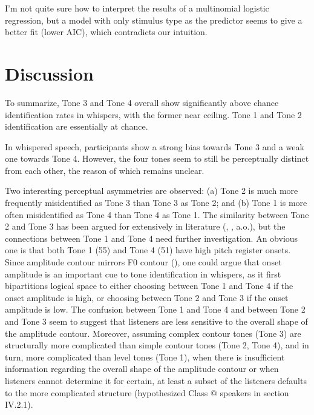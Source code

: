 \documentclass[12pt,letterpaper]{scrartcl}
\makeatletter
\newcommand*{\rom}[1]{\expandafter\@slowromancap\romannumeral #1@}
\makeatother
\begin{document}
I'm not quite sure how to interpret the results of a multinomial logistic regression, but a model with only stimulus type as the predictor seems to give a better fit (lower AIC), which contradicts our intuition.

\section{Discussion}

To summarize, Tone 3 and Tone 4 overall show significantly above chance identification rates in whispers, with the former near ceiling. Tone 1 and Tone 2 identification are essentially at chance.

In whispered speech, participants show a strong bias towards Tone 3 and a weak one towards Tone 4. However, the four tones seem to still be perceptually distinct from each other, the reason of which remains unclear.

Two interesting perceptual asymmetries are observed: (a) Tone 2 is much more frequently misidentified as Tone 3 than Tone 3 as Tone 2; and (b) Tone 1 is  more often misidentified as Tone 4 than Tone 4 as Tone 1. The similarity between Tone 2 and Tone 3 has been argued for extensively in literature (\cite{shen1989ProsodyMandarinChinese}, \cite{liu.samuel2004PerceptionMandarinLexical}, a.o.), but the connections between Tone 1 and Tone 4 need further investigation. An obvious one is that both Tone 1 (55) and Tone 4 (51) have high pitch register onsets. Since amplitude contour mirrors F0 contour (\cite{whalen.xu1992InformationMandarintones}), one could argue that onset amplitude is an important cue to tone identification in whispers, as it first bipartitions logical space to either choosing between Tone 1 and Tone 4 if the onset amplitude is high, or choosing between Tone 2 and Tone 3 if the onset amplitude is low. The confusion between Tone 1 and Tone 4 and between Tone 2 and Tone 3 seem to suggest that listeners are less sensitive to the overall shape of the amplitude contour. Moreover, assuming complex contour tones (Tone 3) are structurally more complicated than simple contour tones (Tone 2, Tone 4), and in turn, more complicated than level tones (Tone 1), when there is insufficient information regarding the overall shape of the amplitude contour or when listeners cannot determine it for certain, at least a subset of the listeners defaults to the more complicated structure (hypothesized Class \rom{2} speakers in section IV.2.1).
\end{document}
